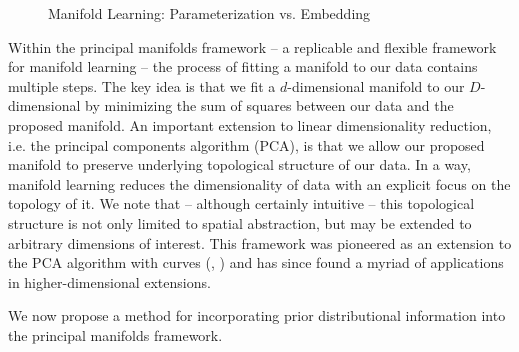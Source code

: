 \documentclass[twoside,11pt]{article}
\begin{document}
\begin{figure}
\begin{center}
  \end{center}
  \caption{Manifold Learning: Parameterization vs. Embedding}\label{fig:manifolds}
\end{figure}

Within the principal manifolds framework \citep{Meng2021} -- a replicable and flexible framework for manifold learning -- the process of fitting a manifold to our data contains multiple steps. The key idea is that we fit a $d$-dimensional manifold to our $D$-dimensional by minimizing the sum of squares between our data and the proposed manifold. An important extension to linear dimensionality reduction, i.e. the principal components algorithm (PCA), is that we allow our proposed manifold to preserve underlying topological structure of our data. In a way, manifold learning reduces the dimensionality of data with an explicit focus on the topology of it. We note that -- although certainly intuitive -- this topological structure is not only limited to spatial abstraction, but may be extended to arbitrary dimensions of interest. This framework was pioneered as an extension to the PCA algorithm with curves (\citet{HastieStuetzle1989}, \citet{Tibshirani1992}) and has since found a myriad of applications in higher-dimensional extensions. 

We now propose a method for incorporating prior distributional information into the principal manifolds framework. 
\end{document}
